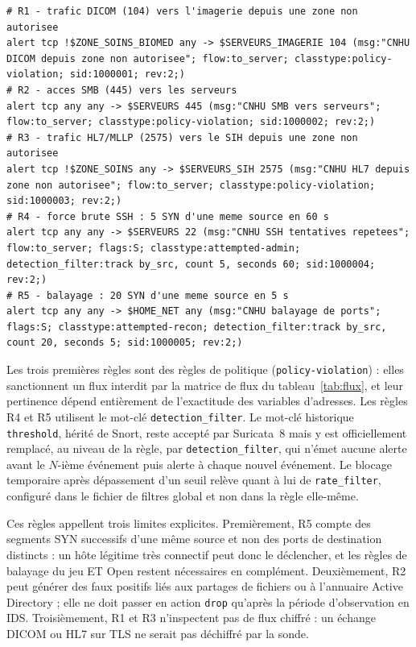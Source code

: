 \begin{lstlisting}[language={},breaklines=true,basicstyle=\ttfamily\scriptsize]
# R1 - trafic DICOM (104) vers l'imagerie depuis une zone non autorisee
alert tcp !$ZONE_SOINS_BIOMED any -> $SERVEURS_IMAGERIE 104 (msg:"CNHU DICOM depuis zone non autorisee"; flow:to_server; classtype:policy-violation; sid:1000001; rev:2;)
# R2 - acces SMB (445) vers les serveurs
alert tcp any any -> $SERVEURS 445 (msg:"CNHU SMB vers serveurs"; flow:to_server; classtype:policy-violation; sid:1000002; rev:2;)
# R3 - trafic HL7/MLLP (2575) vers le SIH depuis une zone non autorisee
alert tcp !$ZONE_SOINS any -> $SERVEURS_SIH 2575 (msg:"CNHU HL7 depuis zone non autorisee"; flow:to_server; classtype:policy-violation; sid:1000003; rev:2;)
# R4 - force brute SSH : 5 SYN d'une meme source en 60 s
alert tcp any any -> $SERVEURS 22 (msg:"CNHU SSH tentatives repetees"; flow:to_server; flags:S; classtype:attempted-admin; detection_filter:track by_src, count 5, seconds 60; sid:1000004; rev:2;)
# R5 - balayage : 20 SYN d'une meme source en 5 s
alert tcp any any -> $HOME_NET any (msg:"CNHU balayage de ports"; flags:S; classtype:attempted-recon; detection_filter:track by_src, count 20, seconds 5; sid:1000005; rev:2;)
\end{lstlisting}

Les trois premières règles sont des règles de politique (\texttt{policy-violation}) : elles sanctionnent un flux interdit par la matrice de flux du tableau~\ref{tab:flux}, et leur pertinence dépend entièrement de l'exactitude des variables d'adresses. Les règles R4 et R5 utilisent le mot-clé \texttt{detection\_filter}. Le mot-clé historique \texttt{threshold}, hérité de Snort, reste accepté par Suricata~8 mais y est officiellement remplacé, au niveau de la règle, par \texttt{detection\_filter}, qui n'émet aucune alerte avant le $N$-ième événement puis alerte à chaque nouvel événement\cite{suricatadoc}. Le blocage temporaire après dépassement d'un seuil relève quant à lui de \texttt{rate\_filter}, configuré dans le fichier de filtres global et non dans la règle elle-même.

Ces règles appellent trois limites explicites. Premièrement, R5 compte des segments SYN successifs d'une même source et non des ports de destination distincts : un hôte légitime très connectif peut donc le déclencher, et les règles de balayage du jeu ET Open restent nécessaires en complément. Deuxièmement, R2 peut générer des faux positifs liés aux partages de fichiers ou à l'annuaire Active Directory ; elle ne doit passer en action \texttt{drop} qu'après la période d'observation en IDS. Troisièmement, R1 et R3 n'inspectent pas de flux chiffré : un échange DICOM ou HL7 sur TLS ne serait pas déchiffré par la sonde.

